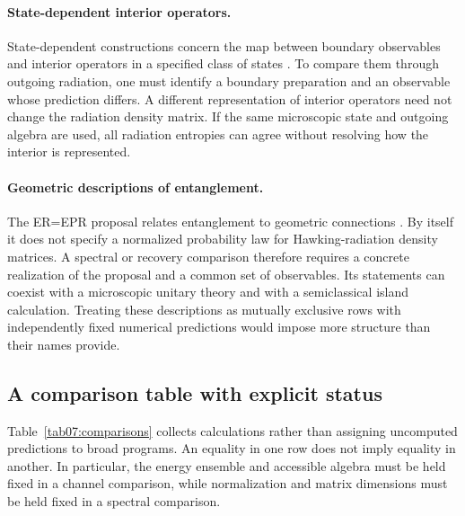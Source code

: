 \documentclass[11pt,letterpaper]{article}
\theoremstyle{plain}
\theoremstyle{definition}
\theoremstyle{remark}
\begin{document}
\paragraph{State-dependent interior operators.}
State-dependent constructions concern the map between boundary
observables and interior operators in a specified class of states
\cite{papadodimasraju2014}. To compare them through outgoing radiation,
one must identify a boundary preparation and an observable whose
prediction differs. A different representation of interior operators
need not change the radiation density matrix. If the same microscopic
state and outgoing algebra are used, all radiation entropies can agree
without resolving how the interior is represented.

\paragraph{Geometric descriptions of entanglement.}
The ER=EPR proposal relates entanglement to geometric connections
\cite{maldacenasusskind2013}. By itself it does not specify a normalized
probability law for Hawking-radiation density matrices. A spectral or
recovery comparison therefore requires a concrete realization of the
proposal and a common set of observables. Its statements can coexist
with a microscopic unitary theory and with a semiclassical island
calculation. Treating these descriptions as mutually exclusive rows
with independently fixed numerical predictions would impose more
structure than their names provide.

\subsection{A comparison table with explicit status}

Table~\ref{tab07:comparisons} collects calculations rather than assigning
uncomputed predictions to broad programs. An equality in one row does
not imply equality in another. In particular, the energy ensemble and
accessible algebra must be held fixed in a channel comparison, while
normalization and matrix dimensions must be held fixed in a spectral
comparison.
\end{document}

